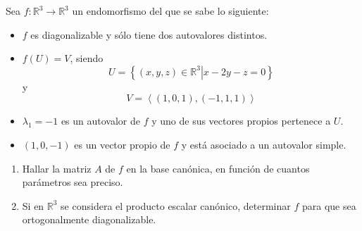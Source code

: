 \begin{enunciado}
 Sea $f: \mathbb{R}^3 \to \mathbb{R}^3$ un endomorfismo del que se sabe lo siguiente:
 \begin{itemize}
  \item $f$ es diagonalizable y s\'olo tiene dos autovalores distintos.
  
  \item $f(U) = V$, siendo
  \begin{equation*}
   U = \left\{ \left. (x,y,z) \in \mathbb{R}^3 \right| x-2y-z = 0 \right\}
  \end{equation*}
  y
  \begin{equation*}
   V = \left< (1,0,1), (-1,1,1) \right>
  \end{equation*}
  
  \item $\lambda_1 = -1$ es un autovalor de $f$ y uno de sus vectores propios pertenece a $U$.
  
  \item $(1, 0, -1)$ es un vector propio de $f$ y est\'a asociado a un autovalor simple.
 \end{itemize}
 
 \begin{enumerate}[$a$)]
  \item Hallar la matriz $A$ de $f$ en la base can\'onica, en funci\'on de cuantos par\'ametros sea preciso.
  
  \item Si en $\mathbb{R}^3$ se considera el producto escalar can\'onico, determinar $f$ para que sea ortogonalmente diagonalizable.
 \end{enumerate}
\end{enunciado}
 
